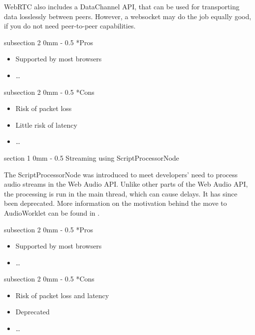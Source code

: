 \documentclass[11pt, a4paper, twoside]{article}
\makeatletter
\renewcommand{\subsection}{\@startsection
  {subsection}%
  {2}%
  {0mm}%
  {-\baselineskip}%
  {0.5\baselineskip}%
  {\bfseries\sffamily\large}}%
\renewcommand{\section}{\@startsection
  {section}%
  {1}%
  {0mm}%
  {-\baselineskip}%
  {0.5\baselineskip}%
  {\bfseries\sffamily\Large}}%
\makeatother
\begin{document}
WebRTC also includes a DataChannel API, that can be used for
transporting data losslessly between peers. However, a websocket may
do the job equally good, if you do not need peer-to-peer capabilities.

\subsection*{Pros}
\begin{itemize}
\item Supported by most browsers \cite{webrtcsupport}
\item \ldots
\end{itemize}

\subsection*{Cons}
\begin{itemize}
\item Risk of packet loss
\item Little risk of latency
\item \ldots
\end{itemize}

\section{Streaming using ScriptProcessorNode}

The ScriptProcessorNode\cite{scriptprocessornode} was introduced to meet developers' need to process audio streams in the Web Audio API. Unlike other parts of the Web Audio API, the processing is run in the main thread, which can cause delays. It has since been deprecated. More information on the motivation behind the move to AudioWorklet can be found in \cite{icmc}.

\subsection*{Pros}
\begin{itemize}
\item Supported by most browsers
\item \ldots
\end{itemize}

\subsection*{Cons}
\begin{itemize}
\item Risk of packet loss and latency
\item Deprecated
\item \ldots
\end{itemize}
\end{document}
